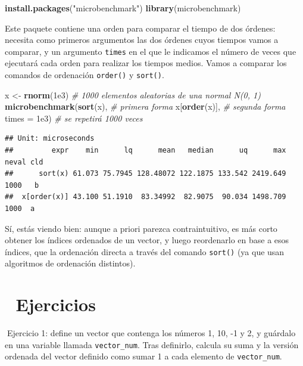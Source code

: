 \documentclass[11pt,]{book}
\newenvironment{Shaded}{\begin{snugshade}}{\end{snugshade}}
\newcommand{\CommentTok}[1]{\textcolor[rgb]{0.37,0.37,0.37}{\textit{#1}}}
\newcommand{\DataTypeTok}[1]{\textcolor[rgb]{0.27,0.27,0.27}{#1}}
\newcommand{\FloatTok}[1]{\textcolor[rgb]{0.06,0.06,0.06}{#1}}
\newcommand{\KeywordTok}[1]{\textcolor[rgb]{0.27,0.27,0.27}{\textbf{#1}}}
\newcommand{\NormalTok}[1]{#1}
\newcommand{\StringTok}[1]{\textcolor[rgb]{0.5,0.5,0.5}{#1}}
\begin{document}
\begin{Shaded}
\begin{Highlighting}[]
\KeywordTok{install.packages}\NormalTok{(}\StringTok{"microbenchmark"}\NormalTok{)}
\KeywordTok{library}\NormalTok{(microbenchmark)}
\end{Highlighting}
\end{Shaded}

Este paquete contiene una orden para comparar el tiempo de dos órdenes: necesita como primeros argumentos las dos órdenes cuyos tiempos vamos a comparar, y un argumento \texttt{times} en el que le indicamos el número de veces que ejecutará cada orden para realizar los tiempos medios. Vamos a comparar los comandos de ordenación \texttt{order()} y \texttt{sort()}.

\begin{Shaded}
\begin{Highlighting}[]
\NormalTok{x <-}\StringTok{ }\KeywordTok{rnorm}\NormalTok{(}\FloatTok{1e3}\NormalTok{) }\CommentTok{# 1000 elementos aleatorias de una normal N(0, 1)}
\KeywordTok{microbenchmark}\NormalTok{(}\KeywordTok{sort}\NormalTok{(x), }\CommentTok{# primera forma}
\NormalTok{               x[}\KeywordTok{order}\NormalTok{(x)], }\CommentTok{# segunda forma}
               \DataTypeTok{times =} \FloatTok{1e3}\NormalTok{) }\CommentTok{# se repetirá 1000 veces}
\end{Highlighting}
\end{Shaded}

\begin{verbatim}
## Unit: microseconds
##         expr    min      lq      mean   median      uq      max neval cld
##      sort(x) 61.073 75.7945 128.48072 122.1875 133.542 2419.649  1000   b
##  x[order(x)] 43.100 51.1910  83.34992  82.9075  90.034 1498.709  1000  a
\end{verbatim}

Sí, estás viendo bien: aunque a priori parezca contraintuitivo, es más corto obtener los índices ordenados de un vector, y luego reordenarlo en base a esos índices, que la ordenación directa a través del comando \texttt{sort()} (ya que usan algoritmos de ordenación distintos).

\hypertarget{ejercicios-1}{%
\section{📝 Ejercicios}\label{ejercicios-1}}

📝Ejercicio 1: define un vector que contenga los números 1, 10, -1 y 2, y guárdalo en una variable llamada \texttt{vector\_num}. Tras definirlo, calcula su suma y la versión ordenada del vector definido como sumar 1 a cada elemento de \texttt{vector\_num}.
\end{document}
